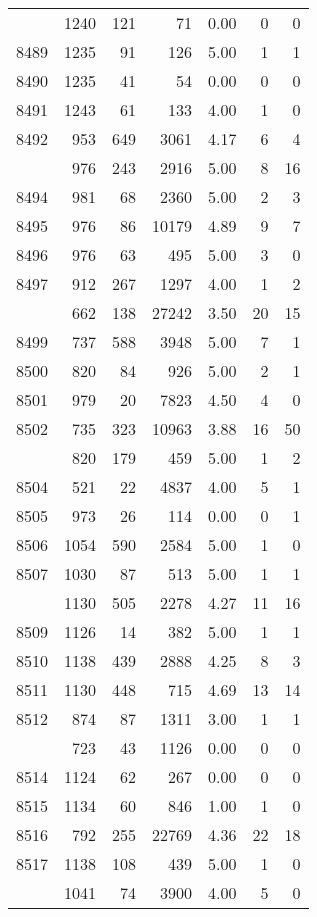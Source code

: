 \documentclass[
]{article}
\begin{document}
\begin{table}
\begin{tabular}[t]{lrrrrrr}
\addlinespace
8488 & 1240 & 121 & 71 & 0.00 & 0 & 0\\
8489 & 1235 & 91 & 126 & 5.00 & 1 & 1\\
8490 & 1235 & 41 & 54 & 0.00 & 0 & 0\\
8491 & 1243 & 61 & 133 & 4.00 & 1 & 0\\
8492 & 953 & 649 & 3061 & 4.17 & 6 & 4\\
\addlinespace
8493 & 976 & 243 & 2916 & 5.00 & 8 & 16\\
8494 & 981 & 68 & 2360 & 5.00 & 2 & 3\\
8495 & 976 & 86 & 10179 & 4.89 & 9 & 7\\
8496 & 976 & 63 & 495 & 5.00 & 3 & 0\\
8497 & 912 & 267 & 1297 & 4.00 & 1 & 2\\
\addlinespace
8498 & 662 & 138 & 27242 & 3.50 & 20 & 15\\
8499 & 737 & 588 & 3948 & 5.00 & 7 & 1\\
8500 & 820 & 84 & 926 & 5.00 & 2 & 1\\
8501 & 979 & 20 & 7823 & 4.50 & 4 & 0\\
8502 & 735 & 323 & 10963 & 3.88 & 16 & 50\\
\addlinespace
8503 & 820 & 179 & 459 & 5.00 & 1 & 2\\
8504 & 521 & 22 & 4837 & 4.00 & 5 & 1\\
8505 & 973 & 26 & 114 & 0.00 & 0 & 1\\
8506 & 1054 & 590 & 2584 & 5.00 & 1 & 0\\
8507 & 1030 & 87 & 513 & 5.00 & 1 & 1\\
\addlinespace
8508 & 1130 & 505 & 2278 & 4.27 & 11 & 16\\
8509 & 1126 & 14 & 382 & 5.00 & 1 & 1\\
8510 & 1138 & 439 & 2888 & 4.25 & 8 & 3\\
8511 & 1130 & 448 & 715 & 4.69 & 13 & 14\\
8512 & 874 & 87 & 1311 & 3.00 & 1 & 1\\
\addlinespace
8513 & 723 & 43 & 1126 & 0.00 & 0 & 0\\
8514 & 1124 & 62 & 267 & 0.00 & 0 & 0\\
8515 & 1134 & 60 & 846 & 1.00 & 1 & 0\\
8516 & 792 & 255 & 22769 & 4.36 & 22 & 18\\
8517 & 1138 & 108 & 439 & 5.00 & 1 & 0\\
\addlinespace
8518 & 1041 & 74 & 3900 & 4.00 & 5 & 0\\

\end{tabular}
\end{table}
\end{document}
